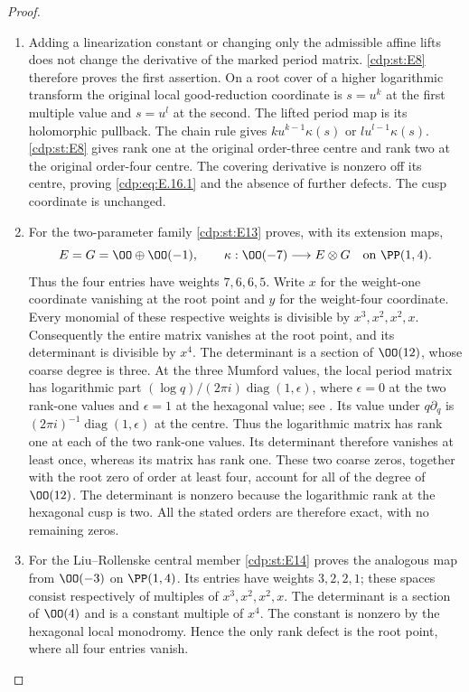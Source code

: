\begin{proof}

\begin{enumerate}[label=\arabic*.,leftmargin=*]
\item Adding a linearization constant or changing only the admissible affine lifts does not change the derivative of the marked period matrix. \ref{cdp:st:E8} therefore proves the first assertion. On a root cover of a higher logarithmic transform the original local good-reduction coordinate is $s=u^k$ at the first multiple value and $s=u^l$ at the second. The lifted period map is its holomorphic pullback. The chain rule gives $k u^{k-1}\kappa(s)$ or $l u^{l-1}\kappa(s)$. \ref{cdp:st:E8} gives rank one at the original order-three centre and rank two at the original order-four centre. The covering derivative is nonzero off its centre, proving \eqref{cdp:eq:E.16.1} and the absence of further defects. The cusp coordinate is unchanged.

\item For the two-parameter family \ref{cdp:st:E13} proves, with its extension maps,
\[
 E=G=\OO\oplus\OO(-1),\qquad
 \kappa:\OO(-7)\longrightarrow E\otimes G
 \quad\text{on }\PP(1,4).
\]
Thus the four entries have weights $7,6,6,5$. Write $x$ for the weight-one coordinate vanishing at the root point and $y$ for the weight-four coordinate. Every monomial of these respective weights is divisible by $x^3,x^2,x^2,x$. Consequently the entire matrix vanishes at the root point, and its determinant is divisible by $x^4$. The determinant is a section of $\OO(12)$, whose coarse degree is three. At the three Mumford values, the local period matrix has logarithmic
part $(\log q)/(2\pi i)\operatorname{diag}(1,\epsilon)$, where
$\epsilon=0$ at the two rank-one values and $\epsilon=1$ at the
hexagonal value; see \cite[equation~(3.1), p.~6]{Viaclovsky2026Two}.
Its value under $q\partial_q$ is
$(2\pi i)^{-1}\operatorname{diag}(1,\epsilon)$ at the centre.
Thus the logarithmic matrix has rank one at each of the two rank-one values. Its determinant therefore vanishes at least once, whereas its matrix has rank one. These two coarse zeros, together with the root zero of order at least four, account for all of the degree of $\OO(12)$. The determinant is nonzero because the logarithmic rank at the hexagonal cusp is two. All the stated orders are therefore exact, with no remaining zeros.

\item For the Liu--Rollenske central member \ref{cdp:st:E14} proves the analogous map from $\OO(-3)$ on $\PP(1,4)$. Its entries have weights $3,2,2,1$; these spaces consist respectively of multiples of $x^3,x^2,x^2,x$. The determinant is a section of $\OO(4)$ and is a constant multiple of $x^4$. The constant is nonzero by the hexagonal local monodromy. Hence the only rank defect is the root point, where all four entries vanish.


\end{enumerate}
\end{proof}
